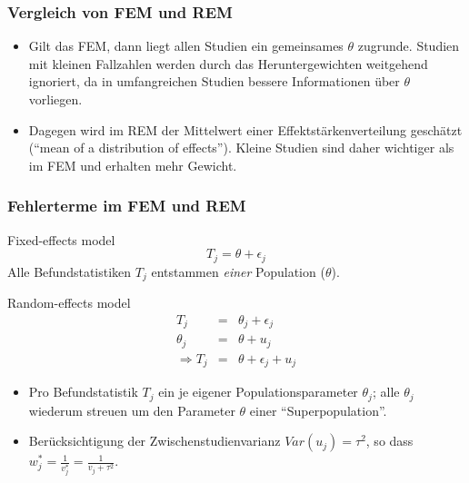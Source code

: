 \begin{frame}
  \frametitle{Vergleich von FEM und REM}
  \begin{itemize}[<+->]
  \item Gilt das FEM, dann liegt allen Studien ein gemeinsames $\theta$
    zugrunde. Studien mit kleinen Fallzahlen werden durch das Heruntergewichten
    weitgehend ignoriert, da in umfangreichen Studien bessere Informationen über
    $\theta$ vorliegen.
  \item Dagegen wird im REM der Mittelwert einer Effektstärkenverteilung
    geschätzt ("`mean of a distribution of effects"'). Kleine Studien sind daher
    wichtiger als im FEM und erhalten mehr Gewicht.
  \end{itemize}
\end{frame}


\begin{frame}[shrink=5]
  \frametitle{Fehlerterme im FEM und REM}\label{slide:fem-refm-fehler}
  \begin{small}
    \begin{block}{Fixed-effects model}
      \begin{equation*}\label{eq:hlm-level1fem}
        T_j = \theta + \epsilon_{j}
      \end{equation*}
      Alle Befundstatistiken $T_j$ entstammen \emph{einer} Population ($\theta$).
    \end{block}
    \pause
    \begin{block}{Random-effects model}
      \begin{eqnarray*}
        T_j & = & \theta_j + \epsilon_{j} \\
        \theta_j & = & \theta + u_j \\
        \Rightarrow  T_j & = & \theta + \epsilon_{j} + u_j
      \end{eqnarray*}
      \begin{itemize}
      \item Pro Befundstatistik $T_j$ ein je eigener Populationsparameter
        $\theta_j$; alle $\theta_j$ wiederum streuen um den Parameter
        $\theta$ einer "`Superpopulation"'.
      \item Berücksichtigung der Zwischenstudienvarianz $Var(u_j)=\tau^2$, so
        dass $w^*_j = \frac{1}{v_j^*} = \frac{1}{v_j+\tau^2}$.
      \end{itemize}

      \end{block}
  \end{small}
\end{frame}


